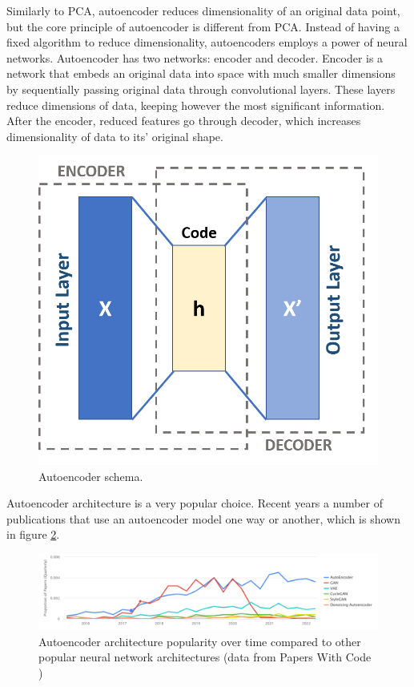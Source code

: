 Similarly to PCA, autoencoder reduces dimensionality of an original data point, but the core principle of autoencoder is different from PCA. Instead of having a fixed algorithm to reduce dimensionality, autoencoders employs a power of neural networks. Autoencoder has two networks: encoder and decoder. Encoder is a network that embeds an original data into space with much smaller dimensions by sequentially passing original data through convolutional layers. These layers reduce dimensions of data, keeping however the most significant information. After the encoder, reduced features go through decoder, which increases dimensionality of data to its' original shape.

\begin{figure}[!ht]
    \centering
    \includegraphics[width=\textwidth]{figure/Autoencoder_schema.png}
    \caption{Autoencoder schema.}
    \label{autoencoder-schema}
\end{figure}

Autoencoder architecture is a very popular choice. Recent years a number of publications that use an autoencoder model one way or another, which is shown in figure \ref{autoencoder-popularity-dynamics}.

\begin{figure}[!ht]
    \centering
    \includegraphics[width=\textwidth]{figure/autoencoder-popularity-over-time.png}
    \caption{Autoencoder architecture popularity over time compared to other popular neural network architectures (data from Papers With Code \cite{autoencoder_papers})}
    \label{autoencoder-popularity-dynamics}
\end{figure}

